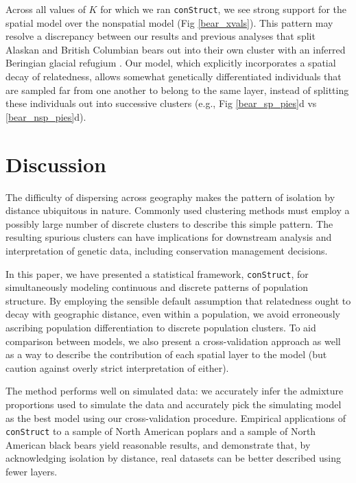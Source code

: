 \documentclass[12pt]{article}
\begin{document}
Across all values of $K$ for which we ran \texttt{conStruct},
we see strong support for the spatial model over the nonspatial model (Fig \ref{bear_xvals}).
This pattern may resolve a discrepancy between our results and 
previous analyses that split Alaskan and British Columbian bears out 
into their own cluster with an inferred Beringian glacial refugium
\citep{Byun1997,Stone2000,Puckett2015}.
Our model, which explicitly incorporates a spatial decay of relatedness, 
allows somewhat genetically differentiated individuals 
that are sampled far from one another to belong to the same layer,
instead of splitting these individuals out into successive clusters 
(e.g., Fig \ref{bear_sp_pies}d vs \ref{bear_nsp_pies}d).

\section*{Discussion}

The difficulty of dispersing across geography makes
the pattern of isolation by distance ubiquitous in nature.
Commonly used clustering methods
must employ a possibly large number of discrete clusters
to describe this simple pattern.
The resulting spurious clusters can have implications for 
downstream analysis and interpretation of genetic data, 
including conservation management decisions. 

In this paper, we have presented a statistical framework, \texttt{conStruct}, for simultaneously 
modeling continuous and discrete patterns of population structure.
By employing the sensible default assumption
that relatedness ought to decay with geographic distance, even within a population, 
we avoid erroneously ascribing population differentiation to discrete population clusters.
To aid comparison between models,
we also present a cross-validation approach 
as well as a way to describe the contribution of each spatial layer to the model
(but caution against overly strict interpretation of either).

The method performs well on simulated data:
we accurately infer the admixture proportions used to simulate the data 
and accurately pick the simulating model as the best model using our cross-validation procedure.
Empirical applications of \texttt{conStruct} to a sample of North American poplars 
and a sample of North American black bears yield reasonable results,
and demonstrate that,
by acknowledging isolation by distance,
real datasets can be better described using fewer layers.
\end{document}
